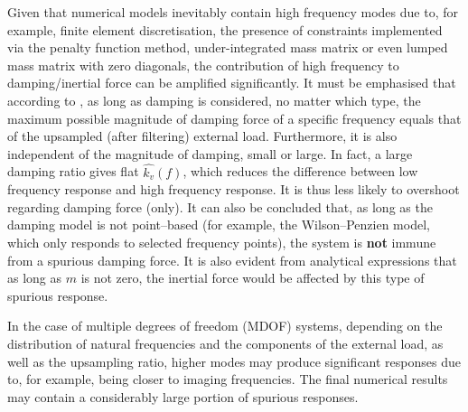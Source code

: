 Given that numerical models inevitably contain high frequency modes due to, for example, finite element discretisation, the presence of constraints implemented via the penalty function method, under-integrated mass matrix or even lumped mass matrix with zero diagonals, the contribution of high frequency to damping/inertial force can be amplified significantly. It must be emphasised that according to , as long as damping is considered, no matter which type, the maximum possible magnitude of damping force of a specific frequency equals that of the upsampled (after filtering) external load. Furthermore, it is also independent of the magnitude of damping, small or large. In fact, a large damping ratio gives flat $\hat{k_v}\left(f\right)$, which reduces the difference between low frequency response and high frequency response. It is thus less likely to overshoot regarding damping force (only). It can also be concluded that, as long as the damping model is not point--based (for example, the Wilson--Penzien model, which only responds to selected frequency points), the system is \textbf{not} immune from a spurious damping force. It is also evident from analytical expressions that as long as $m$ is not zero, the inertial force would be affected by this type of spurious response.

In the case of multiple degrees of freedom (MDOF) systems, depending on the distribution of natural frequencies and the components of the external load, as well as the upsampling ratio, higher modes may produce significant responses due to, for example, being closer to imaging frequencies. The final numerical results may contain a considerably large portion of spurious responses.
